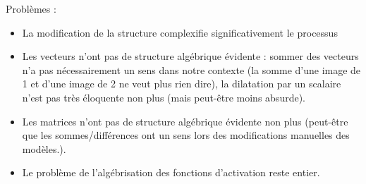 \documentclass[11pt,a4paper]{article}
\begin{document}
	Problèmes : 
	\begin{itemize}
	
		\item La modification de la structure complexifie significativement le processus
	
		\item Les vecteurs n'ont pas de structure algébrique évidente : sommer des vecteurs n'a pas nécessairement un sens dans notre contexte (la somme d'une image de 1 et d'une image de 2 ne veut plus rien dire), la dilatation par un scalaire n'est pas très éloquente non plus (mais peut-être moins absurde).
		
		\item Les matrices n'ont pas de structure algébrique évidente non plus (peut-être que les sommes/différences ont un sens lors des modifications manuelles des modèles.).
		
		\item Le problème de l'algébrisation des fonctions d'activation reste entier.
		
	\end{itemize}
\end{document}
